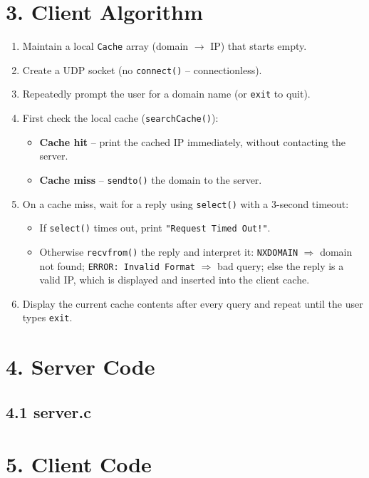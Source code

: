 \documentclass[11pt]{article}
\begin{document}
\section*{3. Client Algorithm}
\begin{enumerate}
  \item Maintain a local \texttt{Cache} array (domain $\to$ IP) that starts empty.
  \item Create a UDP socket (no \texttt{connect()} -- connectionless).
  \item Repeatedly prompt the user for a domain name (or \texttt{exit} to quit).
  \item First check the local cache (\texttt{searchCache()}):
  \begin{itemize}
    \item \textbf{Cache hit} -- print the cached IP immediately, without contacting the server.
    \item \textbf{Cache miss} -- \texttt{sendto()} the domain to the server.
  \end{itemize}
  \item On a cache miss, wait for a reply using \texttt{select()} with a 3-second timeout:
  \begin{itemize}
    \item If \texttt{select()} times out, print \texttt{"Request Timed Out!"}.
    \item Otherwise \texttt{recvfrom()} the reply and interpret it: \texttt{NXDOMAIN} $\Rightarrow$
          domain not found; \texttt{ERROR: Invalid Format} $\Rightarrow$ bad query; else the reply
          is a valid IP, which is displayed and inserted into the client cache.
  \end{itemize}
  \item Display the current cache contents after every query and repeat until the user types
        \texttt{exit}.
\end{enumerate}

\section*{4. Server Code}
\subsection*{4.1 server.c}


\section*{5. Client Code}
\end{document}
